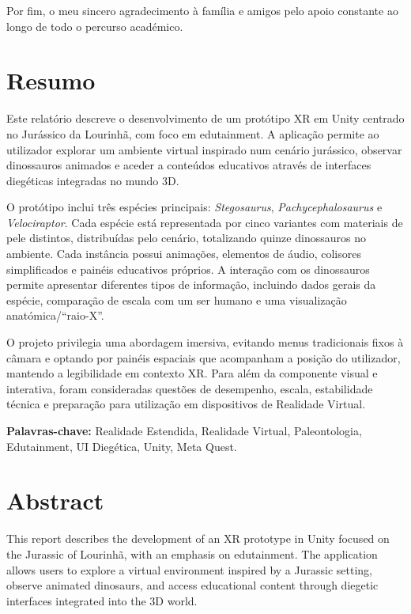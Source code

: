 \documentclass[a4paper,11pt]{report}
\newcommand{\blankpage}{%
    \newpage
    \thispagestyle{empty}
    \mbox{}
    \newpage
}
\begin{document}
Por fim, o meu sincero agradecimento à família e amigos pelo apoio constante
ao longo de todo o percurso académico.

\blankpage

\chapter*{Resumo}

Este relatório descreve o desenvolvimento de um protótipo XR em Unity centrado
no Jurássico da Lourinhã, com foco em edutainment. A aplicação permite ao
utilizador explorar um ambiente virtual inspirado num cenário jurássico, observar
dinossauros animados e aceder a conteúdos educativos através de interfaces
diegéticas integradas no mundo 3D.

O protótipo inclui três espécies principais: \textit{Stegosaurus},
\textit{Pachycephalosaurus} e \textit{Velociraptor}. Cada espécie está
representada por cinco variantes com materiais de pele distintos, distribuídas
pelo cenário, totalizando quinze dinossauros no ambiente. Cada instância possui
animações, elementos de áudio, colisores simplificados e painéis educativos
próprios. A interação com os dinossauros permite apresentar diferentes tipos de
informação, incluindo dados gerais da espécie, comparação de escala com um ser
humano e uma visualização anatómica/``raio-X''.

O projeto privilegia uma abordagem imersiva, evitando menus tradicionais fixos à
câmara e optando por painéis espaciais que acompanham a posição do utilizador,
mantendo a legibilidade em contexto XR. Para além da componente visual e
interativa, foram consideradas questões de desempenho, escala, estabilidade
técnica e preparação para utilização em dispositivos de Realidade Virtual.

\textbf{Palavras-chave:} Realidade Estendida, Realidade Virtual, Paleontologia,
Edutainment, UI Diegética, Unity, Meta Quest.

\blankpage

\chapter*{Abstract}

This report describes the development of an XR prototype in Unity focused on
the Jurassic of Lourinhã, with an emphasis on edutainment. The application
allows users to explore a virtual environment inspired by a Jurassic setting,
observe animated dinosaurs, and access educational content through diegetic
interfaces integrated into the 3D world.
\end{document}
